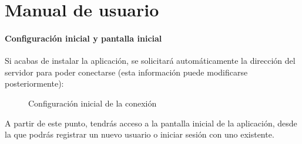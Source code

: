\chapter{Manual de usuario}

\subsubsection{Configuración inicial y pantalla inicial}

Si acabas de instalar la aplicación, se solicitará automáticamente la dirección del servidor para poder conectarse (esta información puede modificarse posteriormente):

\begin{figure} [!htb]
	\centering
	\caption{Configuración inicial de la conexión}
	\label{fig:confIniCon}
\end{figure}

A partir de este punto, tendrás acceso a la pantalla inicial de la aplicación, desde la que podrás registrar un nuevo usuario o iniciar sesión con uno existente.

